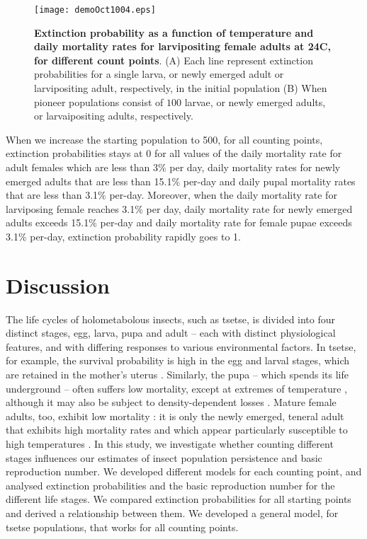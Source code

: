 \documentclass[smallextended]{svjour3}
\begin{document}
 \begin{figure}[h]
 	\texttt{[image: demoOct1004.eps]}
 	\caption{{\bf Extinction probability as a function of temperature and daily mortality rates for larvipositing female adults at 24\degree C, for different count points}. (A) Each line represent extinction probabilities for a single larva, or  newly emerged adult or larvipositing adult, respectively, in the initial population (B) When pioneer populations consist of  $100$ larvae,  or  newly emerged adults, or larvaipositing adults, respectively.}
 	\label{fig:5}       %
 \end{figure}
 
When we increase the starting population to 500, for all counting points, extinction probabilities stays at 0 for all values of the daily mortality rate for adult females which are less than 3\% per day, daily mortality rates for newly emerged adults that are less than 15.1\% per-day and daily pupal mortality rates that are less than 3.1\% per-day. Moreover, when the daily mortality rate for larviposing female reaches 3.1\% per day, daily mortality rate for newly emerged adults exceeds 15.1\% per-day and daily mortality rate for female pupae exceeds 3.1\% per-day, extinction probability rapidly goes to 1. 
\newpage

\section{Discussion}

The life cycles of holometabolous insects, such as tsetse, is divided into four distinct stages, egg, larva, pupa and adult – each with distinct physiological features, and with differing responses to various environmental factors. In tsetse, for example,  the survival probability is high in the egg and larval stages, which are retained in the mother’s uterus \cite{Hargrove1999a}. Similarly, the pupa – which spends its life underground – often suffers low mortality, except at extremes of temperature \cite{PhelpsR.J.&Burrows}, although it may also be subject to density-dependent losses \cite{Rogers1984,RogersD.J.Randolph1984}. Mature female adults, too, exhibit low mortality \cite{Hargrove2011}: it is only the newly emerged, teneral adult that exhibits high mortality rates and which appear particularly susceptible to high temperatures \cite{Ackley2017a}. In this study, we investigate whether counting different stages influences our estimates of insect population persistence and basic reproduction number. We developed different models for each counting point, and analysed extinction probabilities and the basic reproduction number for the different life stages. We compared extinction probabilities for all starting points and derived a relationship between them. We developed a general model, for tsetse populations, that works for all counting points. \\
\end{document}
